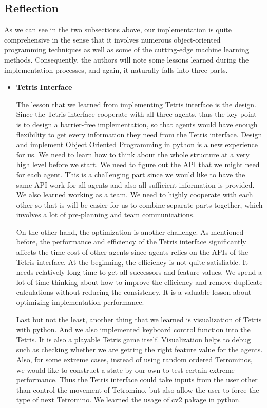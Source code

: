 \documentclass[letterpaper]{article} %
\begin{document}
\subsection{Reflection}

As we can see in the two subsections above, our implementation is quite comprehensive in the sense that it involves numerous object-oriented programming techniques as well as some of the cutting-edge machine learning methods. Consequently, the authors will note some lessons learned during the implementation processes, and again, it naturally falls into three parts.

\begin{itemize}
  
  \item \textbf{Tetris Interface}
  
  The lesson that we learned from implementing Tetris interface is the design. Since the Tetris interface cooperate with all three agents, thus the key point is to design a barrier-free implementation, so that agents would have enough flexibility to get every information they need from the Tetris interface. Design and implement Object Oriented Programming in python is a new experience for us. We need to learn how to think about the whole structure at a very high level before we start. We need to figure out the API that we might need for each agent. This is a challenging part since we would like to have the same API work for all agents and also all sufficient information is provided. We also learned working as a team. We need to highly cooperate with each other so that is will be easier for us to combine separate parts together, which involves a lot of pre-planning and team communications.
  
  On the other hand, the optimization is another challenge. As mentioned before, the performance and efficiency of the Tetris interface significantly affects the time cost of other agents since agents relies on the APIs of the Tetris interface. At the beginning, the efficiency is not quite satisfiable. It needs relatively long time to get all successors and feature values. We spend a lot of time thinking about how to improve the efficiency and remove duplicate calculations without reducing the consistency. It is a valuable lesson about optimizing implementation performance.
  
  Last but not the least, another thing that we learned is visualization of Tetris with python. And we also implemented keyboard control function into the Tetris. It is also a playable Tetris game itself. Visualization helps to debug such as checking whether we are getting the right feature value for the agents. Also, for some extreme cases, instead of using random ordered Tetrominos, we would like to construct a state by our own to test certain extreme performance. Thus the Tetris interface could take inputs from the user other than control the movement of Tetromino, but also allow the user to force the type of next Tetromino. We learned the usage of cv2 pakage in python.
  

\end{itemize}
\end{document}
